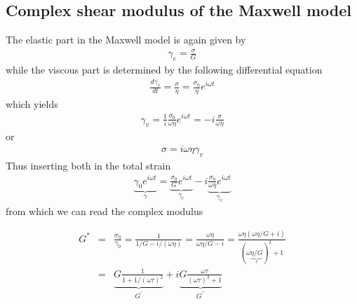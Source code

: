 \documentclass[letterpaper,10pt,english]{sphinxmanual}
\begin{document}
\subsection{Complex shear modulus of the Maxwell model}
\label{\detokenize{notebooks/L24/1_Viscoelasticity:Complex-shear-modulus-of-the-Maxwell-model}}
\sphinxAtStartPar
The elastic part in the Maxwell model is again given by
\begin{equation*}
\begin{split}\gamma_e=\frac{\sigma}{G}\end{split}
\end{equation*}
\sphinxAtStartPar
while the viscous part is determined by the following differential equation
\begin{equation*}
\begin{split}\frac{d \gamma_{v}}{d t}=\frac{\sigma}{\eta}=\frac{\sigma_{0}}{\eta} e^{i \omega t}\end{split}
\end{equation*}
\sphinxAtStartPar
which yields
\begin{equation*}
\begin{split}\gamma_{v}=\frac{1}{i} \frac{\sigma_{0}}{\omega \eta} e^{i \omega t}=-i \frac{\sigma}{\omega \eta}\end{split}
\end{equation*}
\sphinxAtStartPar
or
\begin{equation*}
\begin{split}\sigma=i \omega \eta \gamma_{v}\end{split}
\end{equation*}
\sphinxAtStartPar
Thus inserting both in the total strain
\begin{equation*}
\begin{split}\underbrace{\gamma_{0} e^{i \omega t}}_{\gamma}=\underbrace{\frac{\sigma_{0}}{G} e^{i \omega t}}_{\gamma_e}-i\underbrace{ \frac{\sigma_{0}}{\omega \eta} e^{i \omega t}}_{\gamma_v}\end{split}
\end{equation*}
\sphinxAtStartPar
from which we can read the complex modulus

\sphinxAtStartPar
\begin{eqnarray}
G^{*}&=&\frac{\sigma_{0}}{\gamma_{0}}=\frac{1}{1 / G-i /(\omega \eta)}=\frac{\omega \eta}{\omega \eta / G-i}=\frac{\omega \eta(\omega \eta / G+i)}{(\omega \underbrace{\eta / G}_{\tau})^{2}+1}\\
&=&\underbrace{G \frac{1}{1+1 /(\omega \tau)^{2}}}_{G^{\prime}}+i \underbrace{G \frac{\omega \tau}{(\omega \tau)^{2}+1}}_{G^{\prime \prime}}
\end{eqnarray}
\end{document}
